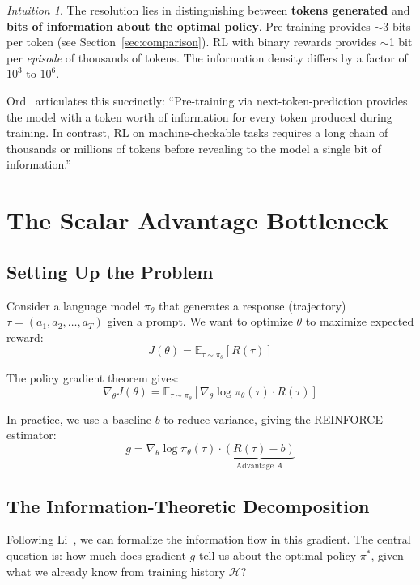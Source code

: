 \documentclass[11pt,a4paper]{article}
\theoremstyle{definition}
\theoremstyle{remark}
\newtheorem{intuition}[theorem]{Intuition}
\newcommand{\E}{\mathbb{E}}
\newcommand{\calH}{\mathcal{H}}
\begin{document}
\begin{intuition}
The resolution lies in distinguishing between \textbf{tokens generated} and \textbf{bits of information about the optimal policy}. Pre-training provides $\sim$3 bits per token (see Section~\ref{sec:comparison}). RL with binary rewards provides $\sim$1 bit per \emph{episode} of thousands of tokens. The information density differs by a factor of $10^3$ to $10^6$.
\end{intuition}

Ord~\cite{ord2025} articulates this succinctly: ``Pre-training via next-token-prediction provides the model with a token worth of information for every token produced during training. In contrast, RL on machine-checkable tasks requires a long chain of thousands or millions of tokens before revealing to the model a single bit of information.''

\section{The Scalar Advantage Bottleneck}

\subsection{Setting Up the Problem}

Consider a language model $\pi_\theta$ that generates a response (trajectory) $\tau = (a_1, a_2, \ldots, a_T)$ given a prompt. We want to optimize $\theta$ to maximize expected reward:
\[
J(\theta) = \E_{\tau \sim \pi_\theta}[R(\tau)]
\]

The policy gradient theorem gives:
\[
\nabla_\theta J(\theta) = \E_{\tau \sim \pi_\theta}\left[\nabla_\theta \log \pi_\theta(\tau) \cdot R(\tau)\right]
\]

In practice, we use a baseline $b$ to reduce variance, giving the REINFORCE estimator:
\[
g = \nabla_\theta \log \pi_\theta(\tau) \cdot \underbrace{(R(\tau) - b)}_{\text{Advantage } A}
\]

\subsection{The Information-Theoretic Decomposition}

Following Li~\cite{li2025info}, we can formalize the information flow in this gradient. The central question is: how much does gradient $g$ tell us about the optimal policy $\pi^*$, given what we already know from training history $\calH$?
\end{document}
